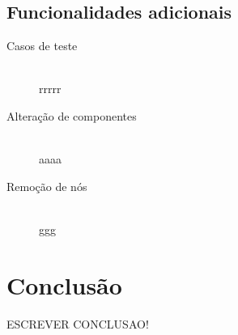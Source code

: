 \documentclass[12pt]{article}
\begin{document}
\subsection{Funcionalidades adicionais}

\begin{description} 
\item[Casos de teste] \hfill \\
rrrrr

\item[Alteração de componentes] \hfill \\
aaaa

\item[Remoção de nós] \hfill \\
ggg


\end{description}

\newpage

\section{Conclusão} 

ESCREVER CONCLUSAO! 


\end{document}
